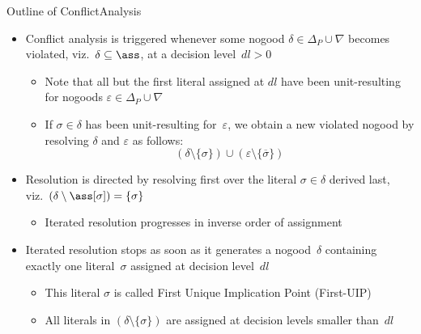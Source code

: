 \begin{frame}{Outline of {ConflictAnalysis}}
\begin{itemize}
\item Conflict analysis is triggered whenever
      some nogood $\delta\in\Delta_P\cup\nabla$
      becomes violated, viz.\ $\delta\subseteq\ass$,
      at a decision level~$\mathit{dl}>0$
      \begin{itemize}
      \item Note that all but the first literal assigned at $\mathit{dl}$
        have been unit-resulting for nogoods
        $\varepsilon\in\Delta_P\cup\nabla$
      \item If $\sigma\in\delta$ has been unit-resulting for~$\varepsilon$,
        we obtain a new violated nogood
        by resolving $\delta$ and $\varepsilon$ as follows:
        \[
        (\delta\setminus\{\sigma\})\cup(\varepsilon\setminus\{\overline{\sigma}\})
        \]
      \end{itemize}
\pause
\item Resolution is directed by resolving first over the literal $\sigma\in\delta$
      derived last, viz.\ $(\delta\setminus\ass[\sigma])=\{\sigma\}$
      \begin{itemize}
      \item Iterated resolution progresses in inverse
                     order of assignment
      \end{itemize}
\pause
\item Iterated resolution stops as soon as it generates
      a nogood~$\delta$ containing exactly one literal~$\sigma$ assigned
      at decision level~$\mathit{dl}$
  \begin{itemize}
  \item This literal $\sigma$ is called \alert{First Unique Implication Point} (First-UIP)
  \item All literals in $(\delta\setminus\{\sigma\})$ are assigned
        at decision levels smaller than~$\mathit{dl}$
  \end{itemize}
\end{itemize}
\end{frame}
\begin{frame}[c]

\end{frame}
